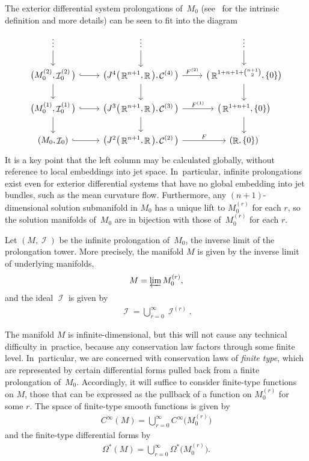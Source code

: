 \documentclass[pdftex]{sigma}
\DeclareMathOperator{\R}{\mathbb{R}}
\DeclareMathOperator{\I}{\mathcal{I}}
\DeclareMathOperator{\contact}{\mathcal{C}}
\newcommand{\cinfinity}[1]{C^\infty\big(#1\big)}
\newcommand{\M}[1]{M_0^{(#1)}}
\newcommand{\Ip}[1]{\I^{(#1)}}
\newcommand{\cMinfty}{C^\infty(M)}
\newcommand{\jet}[1]{J^{#1}\big(\R^{n+1},\R\big)}
\numberwithin{equation}{section}
\begin{document}
The exterior differential system prolongations of~$M_0$ (see~\cite{BCGGG, Characteristic_Cohomology_I} for the intrinsic definition and more details) can be seen to fit into the diagram
\[
{\begin{tikzcd}
\vdots \arrow{d} & \vdots \ar[d] & \vdots \arrow[d]
\\
\big(M_0^{(2)}, \I_0^{(2)}\big) \arrow{d}\arrow[hookrightarrow]{r} & \big(\jet{4}, \contact^{(4)}\big) \ar[d]\ar[r, "F^{(2)}"] & \big(\R^{1 + n+1 + \binom{n+1}{2}}, \{0\}\big) \arrow[d]
\\
\big(M_0^{(1)}, \I_0^{(1)}\big) \ar[d]\arrow[hookrightarrow]{r} & \big(\jet{3}, \contact^{(3)}\big) \ar[d]\ar[r, "F^{(1)}"] & \big(\R^{1 + n+1}, \{0\}\big) \arrow[d]
\\
(M_0, \I_0) \arrow[hookrightarrow]{r} & \big(\jet{2}, \contact^{(2)}\big) \ar[r, "F"] & (\R, \{0\})
\end{tikzcd}}
\]
It is a key point that the left column may be calculated globally, without reference to local embeddings into jet space. In~particular, infinite prolongations exist even for exterior differential systems that have no global embedding into jet bundles, such as the mean curvature flow.
Furthermore, any $(n+1)$-dimensional solution submanifold in $M_0$ has a unique lift to $\M{r}$ for each $r$, so the solution manifolds of~$M_0$ are in bijection with those of~$\M{r}$ for each $r$.

Let $(M,\I)$ be the infinite prolongation of~$M_0$, the inverse limit of the prolongation tower. More precisely, the manifold $M$ is given by the inverse limit of underlying manifolds,
\begin{gather*}
M = \varprojlim \M{r} ,
\end{gather*}
and the ideal $\I$ is given by
\begin{gather*}
\I = \bigcup_{r=0}^\infty \Ip{r} .
\end{gather*}

The manifold $M$ is infinite-dimensional, but this will not cause any technical difficulty in~prac\-tice, because any conservation law factors through some finite level. In~particular, we are concerned with conservation laws of \emph{finite type}, which are represented by certain differential forms pulled back from a finite prolongation of~$M_0$.
Accordingly, it will suffice to consider finite-type functions on $M$, those that can be expressed as the pullback of a function on $\M{r}$ for some $r$.
The space of finite-type smooth functions is given by
\begin{gather*}
\cMinfty = \bigcup_{r=0}^\infty \cinfinity{\M{r}}
\end{gather*}
and the finite-type differential forms by
\begin{gather*}
\Omega^*(M) = \bigcup_{r=0}^\infty \Omega^*\big(\M{r}\big) .
\end{gather*}
\end{document}
